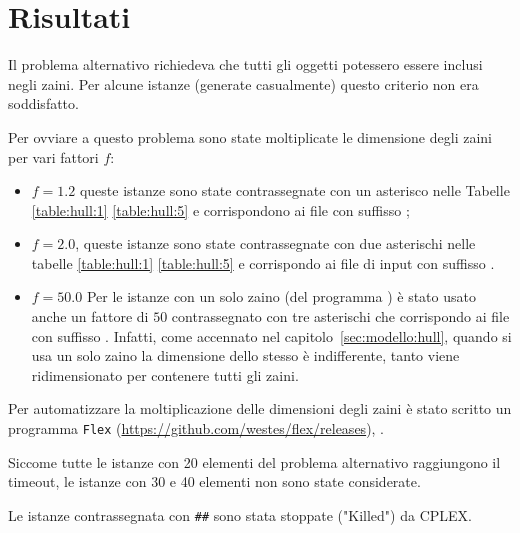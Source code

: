 \section{Risultati}
\label{sec:results}
Il problema alternativo richiedeva che tutti gli oggetti potessero
essere inclusi negli zaini. Per alcune istanze (generate casualmente) 
questo criterio non era soddisfatto.

Per ovviare a questo problema sono state moltiplicate le dimensione degli
zaini per vari fattori $f$:
\begin{itemize}
\item $f = 1.2$ queste istanze sono state contrassegnate con un asterisco nelle
Tabelle \ref{table:hull:1} \ref{table:hull:5} e corrispondono
ai file con suffisso ;
\item $f = 2.0$, queste istanze sono state contrassegnate con due asterischi
nelle tabelle \ref{table:hull:1} \ref{table:hull:5} 
e corrispondo ai file di input con suffisso .
\item $f = 50.0$ Per le istanze con un solo
zaino (del programma ) è stato usato anche un fattore di $50$ 
contrassegnato con tre asterischi che corrispondo ai file con suffisso
. 
Infatti,
come accennato nel capitolo~\ref{sec:modello:hull}, quando si usa un solo zaino
la dimensione dello stesso è indifferente, tanto viene ridimensionato
per contenere tutti gli zaini.

\end{itemize}


Per automatizzare la moltiplicazione delle dimensioni degli zaini è stato 
scritto un programma \verb|Flex| (\url{https://github.com/westes/flex/releases}),
.

Siccome tutte le istanze con 20 elementi del problema alternativo raggiungono
il timeout, le istanze con 30 e 40 elementi non sono state considerate.

Le istanze contrassegnata con \texttt{\#\#} sono stata stoppate ("Killed") da CPLEX.



